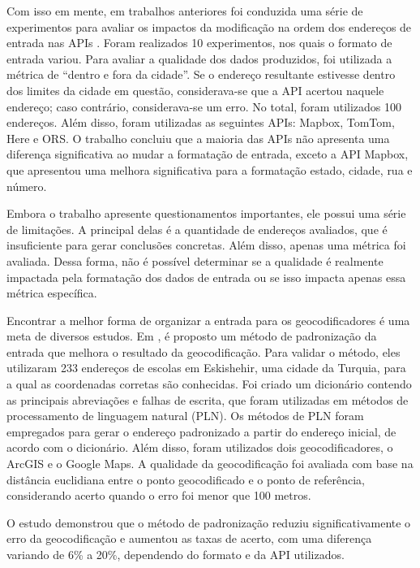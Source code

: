Com isso em mente, em trabalhos anteriores \cite{terralab} foi conduzida uma série de experimentos para avaliar os impactos da modificação na ordem dos endereços de entrada nas APIs \cite{relatorioDeA}. Foram realizados 10 experimentos, nos quais o formato de entrada variou. Para avaliar a qualidade dos dados produzidos, foi utilizada a métrica de ``dentro e fora da cidade''. Se o endereço resultante estivesse dentro dos limites da cidade em questão, considerava-se que a API acertou naquele endereço; caso contrário, considerava-se um erro. No total, foram utilizados 100 endereços. Além disso, foram utilizadas as seguintes APIs: Mapbox, TomTom, Here e ORS. O trabalho concluiu que a maioria das APIs não apresenta uma diferença significativa ao mudar a formatação de entrada, exceto a API Mapbox, que apresentou uma melhora significativa para a formatação estado, cidade, rua e número.

Embora o trabalho apresente questionamentos importantes, ele possui uma série de limitações. A principal delas é a quantidade de endereços avaliados, que é insuficiente para gerar conclusões concretas. Além disso, apenas uma métrica foi avaliada. Dessa forma, não é possível determinar se a qualidade é realmente impactada pela formatação dos dados de entrada ou se isso impacta apenas essa métrica específica.
 
Encontrar a melhor forma de organizar a entrada para os geocodificadores é uma meta de diversos estudos. Em \cite{KUCUKMATCI2018}, é proposto um método de padronização da entrada que melhora o resultado da geocodificação. Para validar o método, eles utilizaram 233 endereços de escolas em Eskishehir, uma cidade da Turquia, para a qual as coordenadas corretas são conhecidas. Foi criado um dicionário contendo as principais abreviações e falhas de escrita, que foram utilizadas em métodos de processamento de linguagem natural (PLN). Os métodos de PLN foram empregados para gerar o endereço padronizado a partir do endereço inicial, de acordo com o dicionário. Além disso, foram utilizados dois geocodificadores, o ArcGIS e o Google Maps. A qualidade da geocodificação foi avaliada com base na distância euclidiana entre o ponto geocodificado e o ponto de referência, considerando acerto quando o erro foi menor que 100 metros.

O estudo demonstrou que o método de padronização reduziu significativamente o erro da geocodificação e aumentou as taxas de acerto, com uma diferença variando de 6\% a 20\%, dependendo do formato e da API utilizados.

